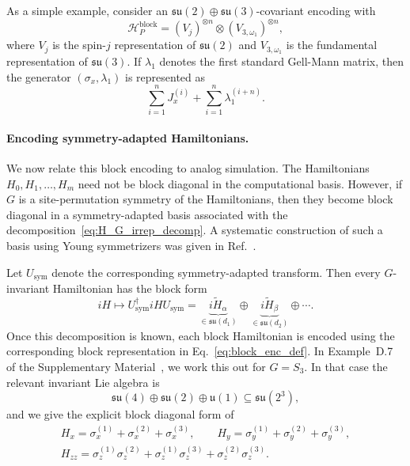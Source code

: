 \documentclass[10pt,twocolumn,superscriptaddress,aps,amsmath,amssymb,citeautoscript,floatfix,prx,longbibliography]{revtex4-2}
\newcounter{alg}
\theoremstyle{plain}
\theoremstyle{plain}
\theoremstyle{plain}
\theoremstyle{plain}
\theoremstyle{plain}
\theoremstyle{plain}
\begin{document}
As a simple example, consider an $\mathfrak{su}(2)\oplus\mathfrak{su}(3)$-covariant encoding with
$$
\mathcal H_P^{\mathrm{block}}
=
(V_j)^{\otimes n}
\otimes
(V_{3,\omega_1})^{\otimes n},
$$
where $V_j$ is the spin-$j$ representation of $\mathfrak{su}(2)$ and $V_{3,\omega_1}$ is the fundamental representation of $\mathfrak{su}(3)$. If $\lambda_1$ denotes the first standard Gell-Mann matrix, then the generator $(\sigma_x,\lambda_1)$ is represented as
$$
\sum_{i=1}^n J_x^{(i)}
+
\sum_{i=1}^n \lambda_1^{(i+n)} .
$$

\paragraph{Encoding symmetry-adapted Hamiltonians.}

We now relate this block encoding to analog simulation. The Hamiltonians ${H_0,H_1,\ldots,H_m}$ need not be block diagonal in the computational basis. However, if $G$ is a site-permutation symmetry of the Hamiltonians, then they become block diagonal in a symmetry-adapted basis associated with the decomposition~\eqref{eq:H_G_irrep_decomp}. A systematic construction of such a basis using Young symmetrizers was given in Ref.~\cite{DAlessandroHartwig2021}.

Let $U_{\mathrm{sym}}$ denote the corresponding symmetry-adapted transform. Then every $G$-invariant Hamiltonian has the block form
$$
iH
\longmapsto
U_{\mathrm{sym}}^\dagger iH U_{\mathrm{sym}}
=
\underbrace{i\widetilde H_{\alpha}}_{\in\mathfrak{su}(d_1)}
\oplus
\underbrace{i\widetilde H_{\beta}}_{\in\mathfrak{su}(d_2)}
\oplus
\cdots .
$$
Once this decomposition is known, each block Hamiltonian is encoded using the corresponding block representation in Eq.~\eqref{eq:block_enc_def}. In Example~D.7 of the Supplementary Material~\cite{SuppMat}, we work this out for $G=S_3$. In that case the relevant invariant Lie algebra is
$$
\mathfrak{su}(4)
\oplus
\mathfrak{su}(2)
\oplus
\mathfrak{u}(1)\subseteq \mathfrak{su}(2^3),
$$
and we give the explicit block diagonal form of
\begin{equation}\label{eq:s3_ex_hams}
\begin{gathered}
H_x
=
\sigma_x^{(1)}
+
\sigma_x^{(2)}
+
\sigma_x^{(3)},
\qquad
H_y
=
\sigma_y^{(1)}
+
\sigma_y^{(2)}
+
\sigma_y^{(3)},
\\
H_{zz}
=
\sigma_z^{(1)}\sigma_z^{(2)}
+
\sigma_z^{(1)}\sigma_z^{(3)}
+
\sigma_z^{(2)}\sigma_z^{(3)} .
\end{gathered}
\end{equation}
\end{document}
